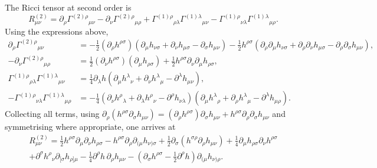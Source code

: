 \begin{solution}
The Ricci tensor at second order is
\begin{equation}
    R^{(2)}_{\mu\nu} = \partial_\rho\Gamma^{(2)\rho}{}_{\mu\nu}-\partial_\nu\Gamma^{(2)\rho}{}_{\mu\rho}+\Gamma^{(1)\rho}{}_{\rho\lambda}\Gamma^{(1)\lambda}{}_{\mu\nu}-\Gamma^{(1)\rho}{}_{\nu\lambda}\Gamma^{(1)\lambda}{}_{\mu\rho}.
\end{equation}
Using the expressions above,
\begin{align}
    \partial_\rho\Gamma^{(2)\rho}{}_{\mu\nu} &= -\frac{1}{2}(\partial_\rho h^{\rho\sigma})(\partial_\mu h_{\nu\sigma}+\partial_\nu h_{\mu\sigma}-\partial_\sigma h_{\mu\nu})-\frac{1}{2}h^{\rho\sigma}(\partial_\rho\partial_\mu h_{\nu\sigma}+\partial_\rho\partial_\nu h_{\mu\sigma}-\partial_\rho\partial_\sigma h_{\mu\nu}),\\
    -\partial_\nu\Gamma^{(2)\rho}{}_{\mu\rho} &= \frac{1}{2}(\partial_\nu h^{\rho\sigma})(\partial_\mu h_{\rho\sigma})+\frac{1}{2}h^{\rho\sigma}\partial_\nu\partial_\mu h_{\rho\sigma},\\
    \Gamma^{(1)\rho}{}_{\rho\lambda}\Gamma^{(1)\lambda}{}_{\mu\nu} &= \frac{1}{4}\partial_\lambda h\left(\partial_\mu h^\lambda{}_\nu+\partial_\nu h^\lambda{}_\mu-\partial^\lambda h_{\mu\nu}\right),\\
    -\Gamma^{(1)\rho}{}_{\nu\lambda}\Gamma^{(1)\lambda}{}_{\mu\rho} &= -\frac{1}{4}\left(\partial_\nu h^\rho{}_\lambda+\partial_\lambda h^\rho{}_\nu-\partial^\rho h_{\nu\lambda}\right)\left(\partial_\mu h^\lambda{}_\rho+\partial_\rho h^\lambda{}_\mu-\partial^\lambda h_{\mu\rho}\right).
\end{align}
Collecting all terms, using $\partial_\rho(h^{\rho\sigma}\partial_\sigma h_{\mu\nu})=(\partial_\rho h^{\rho\sigma})\partial_\sigma h_{\mu\nu}+h^{\rho\sigma}\partial_\rho\partial_\sigma h_{\mu\nu}$ and symmetrising where appropriate, one arrives at
\begin{equation}
\begin{aligned}
    R^{(2)}_{\mu\nu} = \frac{1}{2}h^{\rho\sigma}\partial_\mu\partial_\nu h_{\rho\sigma} - h^{\rho\sigma}\partial_\rho\partial_{(\mu}h_{\nu)\sigma} + \frac{1}{2}\partial_\sigma(h^{\sigma\rho}\partial_\rho h_{\mu\nu}) + \frac{1}{4}\partial_\mu h_{\rho\sigma}\partial_\nu h^{\rho\sigma}\\
    + \partial^\sigma h^\rho{}_\nu\partial_{[\sigma}h_{\rho]\mu} - \frac{1}{4}\partial^\rho h\,\partial_\rho h_{\mu\nu} - \left(\partial_\sigma h^{\rho\sigma} - \frac{1}{2}\partial^\rho h\right)\partial_{(\mu}h_{\nu)\rho}.
\end{aligned}
\end{equation}


\end{solution}
